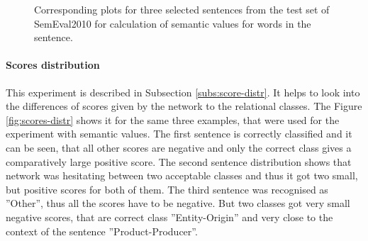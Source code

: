 \begin{figure}[H]
  \tiny
\centering
{}
\caption[Semantic values, general domain supervised experiments]{Corresponding plots for three selected sentences from the test set of SemEval2010 for calculation of semantic values for words in the sentence.}
\label{fig:semantic-val}
\end{figure}

\paragraph{Scores distribution} This experiment is described in Subsection \ref{subs:score-distr}. It helps to look into the differences of scores given by the network to the relational classes.
The Figure \ref{fig:scores-distr} shows it for the same three examples, that were used for the 
experiment with semantic values. The first sentence is correctly classified and it can be seen, that all other scores are 
negative and only the correct class gives a comparatively large positive score. The second sentence 
distribution shows that network was hesitating between two acceptable classes and thus it 
got two small, but positive scores for both of them. The third sentence was recognised as 
''Other'',
 thus all the scores have to be negative. But two classes got very small negative scores, that are 
 correct class ''Entity-Origin'' and very close to the context of the sentence ''Product-Producer''.


